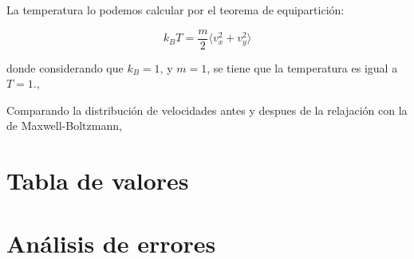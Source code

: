 \documentclass[11pt, twoside]{article} %
\begin{document}
La temperatura lo podemos calcular por el teorema de equipartición:

\begin{equation}
    k_B T = \frac{m}{2}\langle v_x^2 + v_y^2 \rangle
\end{equation}

donde considerando que $k_B =1$, y $m=1$, se tiene que la temperatura es igual a
$T = 1.$, 

Comparando la distribución de velocidades antes y despues de la relajación con la 
de Maxwell-Boltzmann,

\newpage

\appendix

\section{Tabla de valores}


\newpage

\section{Análisis de errores}
\end{document}
